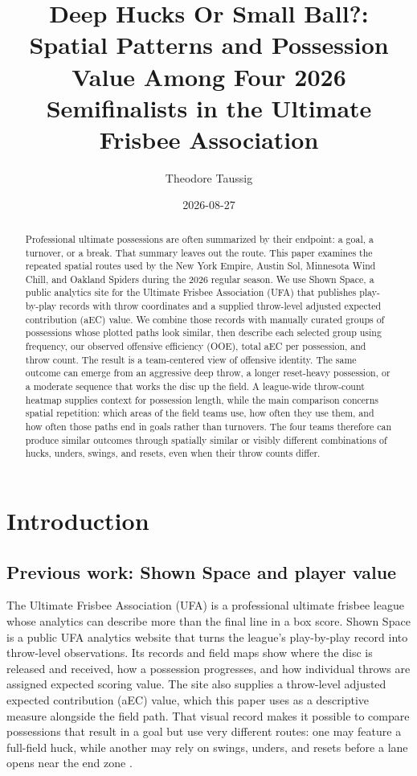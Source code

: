 \documentclass[11pt]{article}
\title{\bfseries Deep Hucks Or Small Ball?:\\[3pt]
  Spatial Patterns and Possession Value Among Four 2026 Semifinalists in the Ultimate Frisbee Association}
\author{Theodore Taussig}
\date{2026-08-27}
\newcommand{\aEC}{aEC}
\begin{document}
\maketitle

\begin{abstract}
Professional ultimate possessions are often summarized by their endpoint: a goal,
a turnover, or a break. That summary leaves out the route. This paper examines
the repeated spatial routes used by the New York Empire, Austin Sol, Minnesota
Wind Chill, and Oakland Spiders during the 2026 regular season. We use Shown Space,
a public analytics site for the Ultimate Frisbee Association (UFA) that publishes play-by-play
records with throw coordinates and a supplied throw-level adjusted expected contribution (\aEC{}) value. We combine those records with
manually curated groups of possessions whose plotted paths look similar, then
describe each selected group using frequency, our observed offensive efficiency
(OOE), total \aEC{} per possession, and throw count. The result is a team-centered
view of offensive identity. The same outcome can emerge from an aggressive deep throw,
a longer reset-heavy possession, or a moderate sequence that works the disc up
the field. A league-wide throw-count heatmap supplies context for possession
length, while the main comparison concerns spatial repetition: which areas of
the field teams use, how often they use them, and how often those paths end in
goals rather than turnovers. The four teams therefore can produce similar
outcomes through spatially similar or visibly different combinations of hucks,
unders, swings, and resets, even when their throw counts differ.
\end{abstract}

\section{Introduction}

\subsection{Previous work: Shown Space and player value}

The Ultimate Frisbee Association (UFA) is a professional ultimate frisbee league
whose analytics can describe more than the final line in a box score. Shown Space
is a public UFA analytics website that turns the league's play-by-play record into
throw-level observations. Its records and field maps show where the disc is
released and received, how a possession progresses, and how individual throws
are assigned expected scoring value. The site also supplies a throw-level
adjusted expected contribution (\aEC{}) value, which this paper uses as a
descriptive measure alongside the field path. That visual record makes it
possible to compare possessions that result in a goal but use very different
routes: one may feature a full-field huck, while another may rely on swings,
unders, and resets before a lane opens near the end zone
\citep{eberhard2026shownspace}.
\end{document}
